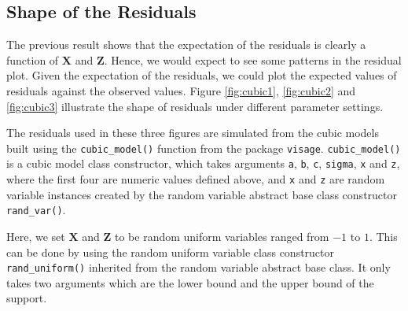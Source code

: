\documentclass{monashthesis}
\begin{document}
\hypertarget{shape-of-the-residuals}{%
\subsection{Shape of the Residuals}\label{shape-of-the-residuals}}

The previous result shows that the expectation of the residuals is clearly a function of \(\boldsymbol{X}\) and \(\boldsymbol{Z}\). Hence, we would expect to see some patterns in the residual plot. Given the expectation of the residuals, we could plot the expected values of residuals against the observed values. Figure \ref{fig:cubic1}, \ref{fig:cubic2} and \ref{fig:cubic3} illustrate the shape of residuals under different parameter settings.

The residuals used in these three figures are simulated from the cubic models built using the \texttt{cubic\_model()} function from the package \texttt{visage}. \texttt{cubic\_model()} is a cubic model class constructor, which takes arguments \texttt{a}, \texttt{b}, \texttt{c}, \texttt{sigma}, \texttt{x} and \texttt{z}, where the first four are numeric values defined above, and \texttt{x} and \texttt{z} are random variable instances created by the random variable abstract base class constructor \texttt{rand\_var()}.

Here, we set \(\boldsymbol{X}\) and \(\boldsymbol{Z}\) to be random uniform variables ranged from \(-1\) to \(1\). This can be done by using the random uniform variable class constructor \texttt{rand\_uniform()} inherited from the random variable abstract base class. It only takes two arguments which are the lower bound and the upper bound of the support.

\begin{Shaded}
\begin{Highlighting}[]
\OtherTok{\textless{}{-}} \NormalTok{(} \SpecialCharTok{{-}}\NormalTok{, } \SpecialCharTok{{-}}\NormalTok{, } \NormalTok{, } \NormalTok{, }
                    \NormalTok{(}\SpecialCharTok{{-}}\NormalTok{, }\NormalTok{), } \NormalTok{(}\SpecialCharTok{{-}}\NormalTok{, }\NormalTok{))}
\end{Highlighting}
\end{Shaded}
\end{document}
